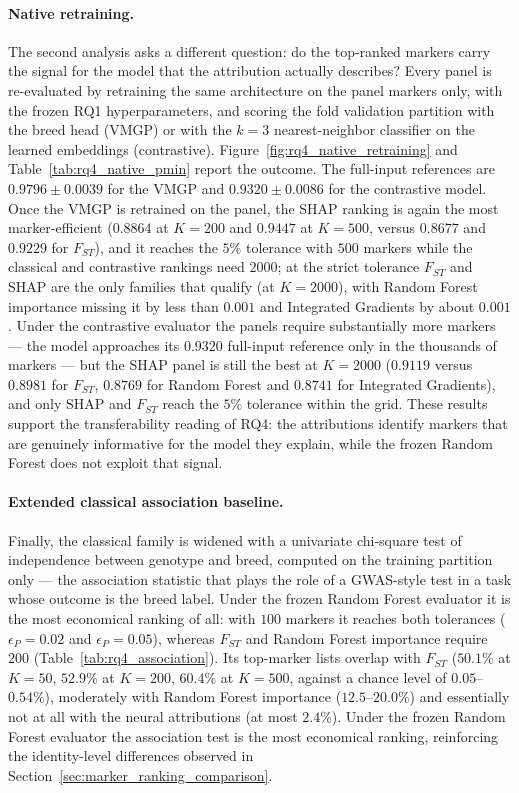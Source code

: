 \paragraph{Native retraining.}
The second analysis asks a different question: do the top-ranked
markers carry the signal for the model that the attribution actually
describes? Every panel is re-evaluated by retraining the same
architecture on the panel markers only, with the frozen RQ1
hyperparameters, and scoring the fold validation partition with the
breed head (VMGP) or with the $k=3$ nearest-neighbor classifier on the
learned embeddings (contrastive).
Figure~\ref{fig:rq4_native_retraining} and
Table~\ref{tab:rq4_native_pmin} report the outcome. The full-input
references are $0.9796 \pm 0.0039$ for the VMGP and $0.9320 \pm 0.0086$
for the contrastive model. Once the VMGP is retrained on the panel, the
SHAP ranking is again the most marker-efficient ($0.8864$ at $K=200$
and $0.9447$ at $K=500$, versus $0.8677$ and $0.9229$ for $F_{ST}$),
and it reaches the $5\%$ tolerance with $500$ markers while the
classical and contrastive rankings need $2000$; at the strict tolerance
$F_{ST}$ and SHAP are the only families that qualify (at $K=2000$),
with Random Forest importance missing it by less than $0.001$ and
Integrated Gradients by about $0.001$. Under the contrastive evaluator the panels require
substantially more markers --- the model approaches its $0.9320$
full-input reference only in the thousands of markers --- but the SHAP
panel is still the best at $K=2000$ ($0.9119$ versus $0.8981$ for
$F_{ST}$, $0.8769$ for Random Forest and $0.8741$ for Integrated
Gradients), and only SHAP and $F_{ST}$ reach the $5\%$ tolerance within
the grid. These results support the transferability reading of RQ4: the
attributions identify markers that are genuinely informative for the
model they explain, while the frozen Random Forest does not exploit
that signal.

\paragraph{Extended classical association baseline.}
Finally, the classical family is widened with a univariate chi-square
test of independence between genotype and breed, computed on the
training partition only --- the association statistic that plays the
role of a GWAS-style test in a task whose outcome is the breed label.
Under the frozen Random Forest evaluator it is the most economical
ranking of all: with $100$ markers it reaches both tolerances
($\epsilon_P=0.02$ and $\epsilon_P=0.05$), whereas $F_{ST}$ and Random
Forest importance require $200$
(Table~\ref{tab:rq4_association}). Its top-marker lists overlap
with $F_{ST}$ ($50.1\%$ at $K=50$, $52.9\%$ at $K=200$,
$60.4\%$ at $K=500$, against a chance level of $0.05$--$0.54\%$),
moderately with Random Forest importance ($12.5$--$20.0\%$) and
essentially not at all with the neural attributions (at most $2.4\%$).
Under the frozen Random Forest evaluator the association test is the
most economical ranking, reinforcing the identity-level differences
observed in Section~\ref{sec:marker_ranking_comparison}.

